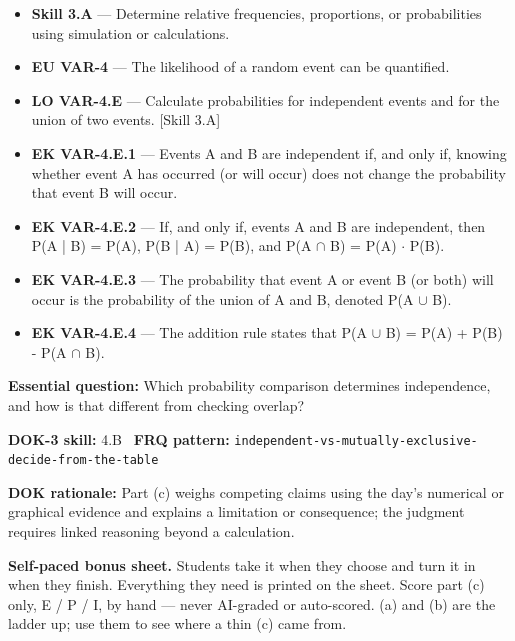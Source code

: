 \documentclass[11pt]{article}
\begin{document}


{\small
\begin{itemize}[leftmargin=1.5em,itemsep=2pt,topsep=2pt]
  \item \textbf{Skill 3.A} --- Determine relative frequencies, proportions, or probabilities using simulation or calculations.
  \item \textbf{EU VAR-4} --- The likelihood of a random event can be quantified.
  \item \textbf{LO VAR-4.E} --- Calculate probabilities for independent events and for the union of two events. [Skill 3.A]
  \item \textbf{EK VAR-4.E.1} --- Events A and B are independent if, and only if, knowing whether event A has occurred (or will occur) does not change the probability that event B will occur.
  \item \textbf{EK VAR-4.E.2} --- If, and only if, events A and B are independent, then P(A | B) = P(A), P(B | A) = P(B), and P(A $\cap$ B) = P(A) $\cdot$ P(B).
  \item \textbf{EK VAR-4.E.3} --- The probability that event A or event B (or both) will occur is the probability of the union of A and B, denoted P(A $\cup$ B).
  \item \textbf{EK VAR-4.E.4} --- The addition rule states that P(A $\cup$ B) = P(A) + P(B) - P(A $\cap$ B).
\end{itemize}
}
\textbf{Essential question:} Which probability comparison determines independence, and how is that different from checking overlap?\par
\textbf{DOK-3 skill:} 4.B \textperiodcentered\ \textbf{FRQ pattern:} {\small\texttt{independent-\allowbreak{}vs-\allowbreak{}mutually-\allowbreak{}exclusive-\allowbreak{}decide-\allowbreak{}from-\allowbreak{}the-\allowbreak{}table}}\par
\textbf{DOK rationale:} Part (c) weighs competing claims using the day's numerical or graphical evidence and explains a limitation or consequence; the judgment requires linked reasoning beyond a calculation.\par

\textbf{Self-paced bonus sheet.} Students take it when they choose and turn it in when they finish. Everything they need is printed on the sheet. Score part (c) only, E / P / I, by hand --- never AI-graded or auto-scored. (a) and (b) are the ladder up; use them to see where a thin (c) came from.\par
\end{document}
